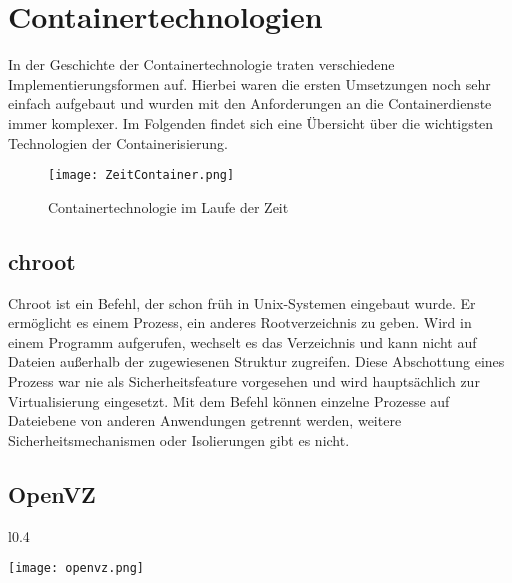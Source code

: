 \section{Containertechnologien} 
\label{sec:Containertechnologien}

In der Geschichte der Containertechnologie traten verschiedene Implementierungsformen auf.
Hierbei waren die ersten Umsetzungen noch sehr einfach aufgebaut und wurden mit den Anforderungen an die Containerdienste immer komplexer.
Im Folgenden findet sich eine Übersicht über die wichtigsten Technologien der Containerisierung.

\begin{figure}[H]
	\begin{center}
		\texttt{[image: ZeitContainer.png]}
	\end{center}
	\caption[Containertechnologie im Laufe der Zeit]{Containertechnologie im Laufe der Zeit}
	\label{fig:CTZeit}
\end{figure}


\subsection*{chroot}
\label{sec:chroot}

Chroot ist ein Befehl, der schon früh in Unix-Systemen eingebaut wurde.
Er ermöglicht es einem Prozess, ein anderes Rootverzeichnis zu geben.
Wird in einem Programm  aufgerufen, wechselt es das Verzeichnis und kann nicht auf Dateien außerhalb der zugewiesenen Struktur zugreifen.
Diese Abschottung eines Prozess war nie als Sicherheitsfeature vorgesehen und wird hauptsächlich zur Virtualisierung eingesetzt.
Mit dem Befehl können einzelne Prozesse auf Dateiebene von anderen Anwendungen getrennt werden, weitere Sicherheitsmechanismen oder Isolierungen gibt es nicht.\cite{IEEE7830207,569694, MANPAGE01}
\newpage
\subsection*{OpenVZ}
\label{sec:OpenVZ}

\begin{wrapfigure}{l}{0.4\textwidth}
	\vspace{-40pt}
	\begin{center}
		\texttt{[image: openvz.png]}
	\end{center}
	\vspace{-15pt}
	\caption[Logo OpenVZ]{ \footnotemark}
	\label{fig:openvz}
	\vspace{-30pt}
\end{wrapfigure}

